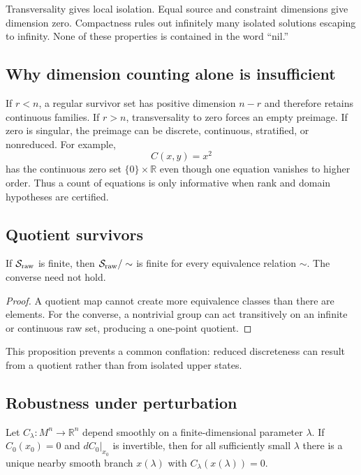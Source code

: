 \documentclass[11pt]{article}
\newcommand{\Surv}{\mathcal S}
\begin{document}
\begin{remark}
Transversality gives local isolation.  Equal source and constraint dimensions
give dimension zero.  Compactness rules out infinitely many isolated solutions
escaping to infinity.  None of these properties is contained in the word
``nil.''
\end{remark}

\subsection{Why dimension counting alone is insufficient}

If $r<n$, a regular survivor set has positive dimension $n-r$ and therefore
retains continuous families.  If $r>n$, transversality to zero forces an empty
preimage.  If zero is singular, the preimage can be discrete, continuous,
stratified, or nonreduced.  For example,
\[
 C(x,y)=x^2
\]
has the continuous zero set $\{0\}\times\mathbb R$ even though one equation
vanishes to higher order.  Thus a count of equations is only informative when
rank and domain hypotheses are certified.

\subsection{Quotient survivors}

\begin{proposition}
\label{prop:quotient-finite}
If $\Surv_{\rm raw}$ is finite, then
$\Surv_{\rm raw}/\sim$ is finite for every equivalence relation $\sim$.
The converse need not hold.
\end{proposition}

\begin{proof}
A quotient map cannot create more equivalence classes than there are elements.
For the converse, a nontrivial group can act transitively on an infinite or
continuous raw set, producing a one-point quotient.
\end{proof}

This proposition prevents a common conflation: reduced discreteness can result
from a quotient rather than from isolated upper states.

\subsection{Robustness under perturbation}

\begin{proposition}
\label{prop:persistence}
Let $C_\lambda:M^n\to\mathbb R^n$ depend smoothly on a finite-dimensional
parameter $\lambda$.  If $C_0(x_0)=0$ and $dC_0|_{x_0}$ is invertible, then
for all sufficiently small $\lambda$ there is a unique nearby smooth branch
$x(\lambda)$ with $C_\lambda(x(\lambda))=0$.
\end{proposition}
\end{document}
